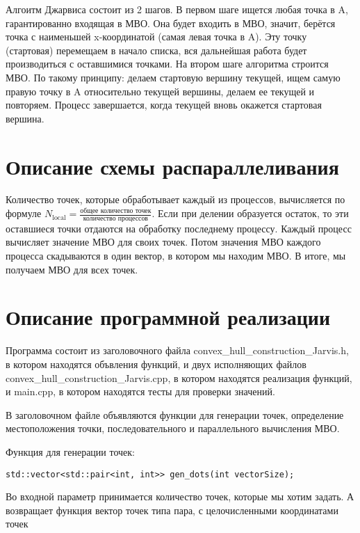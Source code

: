 \documentclass{report}
\begin{document}
\par Алгоитм Джарвиса состоит из 2 шагов. В первом шаге ищется любая точка в A, гарантированно входящая в МВО. Она будет входить в МВО, значит, берётся точка с наименьшей x-координатой (самая левая точка в A). Эту точку (стартовая) перемещаем в начало списка, вся дальнейшая работа будет производиться с оставшимися точками. На втором шаге алгоритма строится МВО. По такому принципу: делаем стартовую вершину текущей, ищем самую правую точку в A относительно текущей вершины, делаем ее текущей и повторяем. Процесс завершается, когда текущей вновь окажется стартовая вершина. 
\newpage

\section*{Описание схемы распараллеливания}
\par Количество точек, которые обработывает каждый из процессов, вычисляется по формуле $N_{\text{local}} = \frac{\text{общее количество точек}}{\text{количество процессов}}$. Если при делении образуется остаток, то эти оставшиеся точки отдаются на обработку последнему процессу. Каждый процесс вычисляет значение МВО для своих точек. Потом значения МВО каждого процесса скадываются в один вектор, в котором мы находим МВО. В итоге, мы получаем МВО для всех точек.
\newpage

\section*{Описание программной реализации}
Программа состоит из заголовочного файла convex\_hull\_construction\_Jarvis.h, в котором находятся объвления функций, и двух исполняющих файлов convex\_hull\_construction\_Jarvis.cpp, в котором находятся реализация функций, и main.cpp, в котором находятся тесты для проверки значений. 
\par В заголовочном файле объявляются функции для генерации точек, определение местоположения точки, последовательного и параллельного вычисления МВО.

\par Функция для генерации точек:
\begin{lstlisting}
std::vector<std::pair<int, int>> gen_dots(int vectorSize);
\end{lstlisting}
Во входной параметр принимается количество точек, которые мы хотим задать. А возвращает функция вектор точек типа пара, с целочисленными координатами точек
\end{document}
